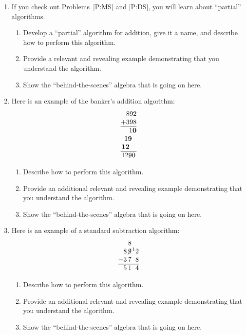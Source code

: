 \begin{problems}
\begin{enumerate}
\item If you check out Problems~\ref{P:MS} and \ref{P:DS}, you will
  learn about ``partial'' algorithms.
\begin{enumerate}
\item Develop a ``partial'' algorithm for addition, give it a name, and describe how to
  perform this algorithm.
\item Provide a relevant and revealing example demonstrating that you
  understand the algorithm.
\item Show the ``behind-the-scenes'' algebra that is going on here.
\end{enumerate}
\item Here is an example of the banker's addition
  algorithm:
\[
\begin{array}{@{}r@{}}
892\\
+398\\ \hline
1\textbf{0}\\
1\textbf{9}~~\\
\textbf{12}~~~\\ \hline
1290\,
\end{array}
\]
\begin{enumerate}
\item Describe how to perform this algorithm.
\item Provide an additional relevant and revealing example
  demonstrating that you understand the algorithm.
\item Show the ``behind-the-scenes'' algebra that is going on here.
\end{enumerate}
\item Here is an example of a standard subtraction
  algorithm:
\[
\begin{array}{@{}r@{}r@{}r@{}r@{}}
&   & 8 &  \\
& 8 & \not{\hspace{-.2ex}9} & \hspace{.3ex}\leftexp{1}2\\
- & 3 & 7 & 8\\ \hline
& 5 & 1 & 4
\end{array}
\]
\begin{enumerate}
\item Describe how to perform this algorithm.
\item Provide an additional relevant and revealing example
  demonstrating that you understand the algorithm.
\item Show the ``behind-the-scenes'' algebra that is going on here.

\end{enumerate}
\end{enumerate}
\end{problems}
